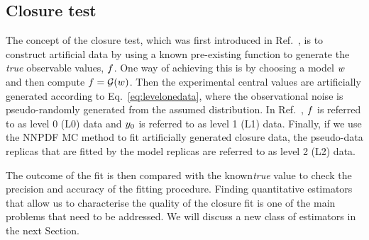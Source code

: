 \subsection{Closure test}
\label{sec:closure-test-intro}

The concept of the closure test, which was first introduced in
Ref.~\cite{nnpdf30}, is to construct artificial data by using a known
pre-existing function to generate the {\em true} observable values, $f$. One
way of achieving this is by choosing a model $w$ and then compute $f
= \mathcal{G}(w)$. Then the experimental central values are artificially
generated according to Eq.~\ref{eq:levelonedata}, where the observational noise
is pseudo-randomly generated from the assumed distribution. In
Ref.~\cite{nnpdf30}, $f$ is referred to as level 0 (L0) data and
$y_0$ is referred to as level 1 (L1) data. Finally, if we use the
NNPDF MC method to fit artificially generated closure data, the pseudo-data
replicas that are fitted by the model replicas are referred to as level 2 (L2)
data.

The outcome of the fit is then compared with the known{\em true} value to check
the precision and accuracy of the fitting procedure. Finding quantitative
estimators that allow us to characterise the quality of the closure fit is one
of the main problems that need to be addressed. We will discuss a new class of
estimators in the next Section. 

